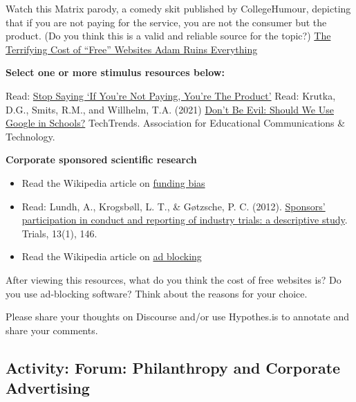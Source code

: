 \documentclass[
]{book}
\providecommand{\tightlist}{%
  \setlength{\itemsep}{0pt}\setlength{\parskip}{0pt}}
\theoremstyle{definition}
\theoremstyle{definition}
\theoremstyle{definition}
\theoremstyle{definition}
\theoremstyle{remark}
\begin{document}
\begin{reflect}
Watch this Matrix parody, a comedy skit published by CollegeHumour, depicting that if you are not paying for the service, you are not the consumer but the product. (Do you think this is a valid and reliable source for the topic?) \href{https://www.youtube.com/watch?v=5pFX2P7JLwA}{The Terrifying Cost of ``Free'' Websites \textbar{} Adam Ruins Everything}

\textbf{Select one or more stimulus resources below:}

Read: \href{https://www.techdirt.com/2012/12/20/stop-saying-if-youre-not-paying-youre-product/}{Stop Saying `If You're Not Paying, You're The Product'}
Read: Krutka, D.G., Smits, R.M., and Willhelm, T.A. (2021) \href{https://link.springer.com/article/10.1007/s11528-021-00599-4}{Don't Be Evil: Should We Use Google in Schools?} TechTrends. Association for Educational Communications \& Technology.

\textbf{Corporate sponsored scientific research}

\begin{itemize}
\tightlist
\item
  Read the Wikipedia article on \href{https://en.wikipedia.org/wiki/Funding_bias}{funding bias}\\
\item
  Read: Lundh, A., Krogsbøll, L. T., \& Gøtzsche, P. C. (2012). \href{https://trialsjournal.biomedcentral.com/articles/10.1186/1745-6215-13-146}{Sponsors' participation in conduct and reporting of industry trials: a descriptive study}. Trials, 13(1), 146.\\
\item
  Read the Wikipedia article on \href{https://en.wikipedia.org/wiki/Ad_blocking}{ad blocking}
\end{itemize}

After viewing this resources, what do you think the cost of free websites is? Do you use ad-blocking software? Think about the reasons for your choice.

Please share your thoughts on Discourse and/or use Hypothes.is to annotate and share your comments.
\end{reflect}

\hypertarget{activity-forum-philanthropy-and-corporate-advertising}{%
\subsection*{Activity: Forum: Philanthropy and Corporate Advertising}\label{activity-forum-philanthropy-and-corporate-advertising}}
\end{document}
